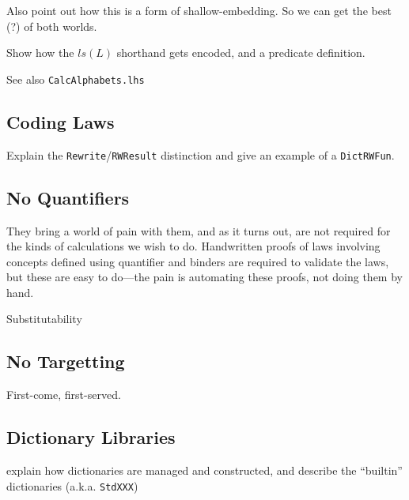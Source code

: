 Also point out how this is a form of shallow-embedding.
So we can get the best (?) of both worlds\cite{Gibbons:2014:FDS}.

Show how the $ls(L)$ shorthand gets encoded,
and a predicate definition.

See also \texttt{CalcAlphabets.lhs}

\subsection{Coding Laws}\label{ssec:coding-laws}

Explain the \texttt{Rewrite}/\texttt{RWResult} distinction
and give an example of a \texttt{DictRWFun}.

\subsection{No Quantifiers}\label{ssec:no-quant}

    They bring a world of pain with them,
    and as it turns out, are not required
    for the kinds of calculations we wish to do.
    Handwritten proofs of laws involving concepts
    defined using quantifier and binders
    are required to validate the laws,
    but these are easy to do---the pain is automating these proofs,
    not doing them by hand.

    Substitutability

\subsection{No Targetting}\label{ssec:no-target}

First-come, first-served.

\subsection{Dictionary Libraries}

explain how dictionaries are managed and constructed,
and describe the ``builtin'' dictionaries (a.k.a. \texttt{StdXXX})
